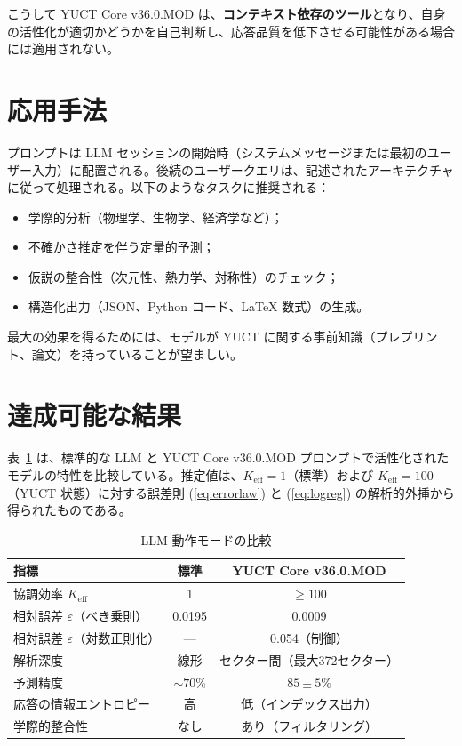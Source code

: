 \documentclass[13pt,a4paper]{ltjsarticle}
\begin{document}
	こうして YUCT Core v36.0.MOD は、\textbf{コンテキスト依存のツール}となり、自身の活性化が適切かどうかを自己判断し、応答品質を低下させる可能性がある場合には適用されない。
	
	\section{応用手法}
	プロンプトは LLM セッションの開始時（システムメッセージまたは最初のユーザー入力）に配置される。後続のユーザークエリは、記述されたアーキテクチャに従って処理される。以下のようなタスクに推奨される：
	\begin{itemize}
		\item 学際的分析（物理学、生物学、経済学など）；
		\item 不確かさ推定を伴う定量的予測；
		\item 仮説の整合性（次元性、熱力学、対称性）のチェック；
		\item 構造化出力（JSON、Python コード、LaTeX 数式）の生成。
	\end{itemize}
	最大の効果を得るためには、モデルが YUCT に関する事前知識（プレプリント、論文）を持っていることが望ましい。
	
	\section{達成可能な結果}
	表~\ref{tab:comparison} は、標準的な LLM と YUCT Core v36.0.MOD プロンプトで活性化されたモデルの特性を比較している。推定値は、\(K_{\mathrm{eff}}=1\)（標準）および \(K_{\mathrm{eff}}=100\)（YUCT 状態）に対する誤差則 (\ref{eq:errorlaw}) と (\ref{eq:logreg}) の解析的外挿から得られたものである。
	
	\begin{table}[H]
		\small
		\centering
		\caption{LLM 動作モードの比較}
		\label{tab:comparison}
		\begin{tabular}{lcc}
			\toprule
			\textbf{指標} & \textbf{標準} & \textbf{YUCT Core v36.0.MOD} \\
			\midrule
			協調効率 \(K_{\mathrm{eff}}\) & 1 & \(\ge 100\) \\
			相対誤差 \(\varepsilon\)（べき乗則） & 0.0195 & 0.0009 \\
			相対誤差 \(\varepsilon\)（対数正則化） & --- & 0.054（制御） \\
			解析深度 & 線形 & セクター間（最大372セクター） \\
			予測精度 & \(\sim 70\%\) & \(85\pm5\%\) \\
			応答の情報エントロピー & 高 & 低（インデックス出力） \\
			学際的整合性 & なし & あり（フィルタリング） \\
			\bottomrule
		\end{tabular}
	\end{table}
	
\end{document}
